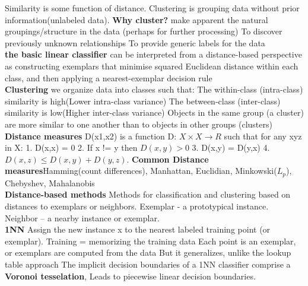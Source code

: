 \documentclass[cheatsheet.tex]{subfiles}
\begin{document}
Similarity is some function of distance. Clustering is grouping data without prior information(unlabeled data). \textbf{Why cluster?} \textbullet make apparent the natural groupings/structure in the data (perhaps for further processing)
\textbullet To discover previously unknown relationships \textbullet To provide generic labels for the data
\\
\textbf{the basic linear classifier} can be interpreted from a distance-based perspective as constructing exemplars that minimise squared Euclidean distance within each class, and then applying a nearest-exemplar decision rule
\\
\textbf{Clustering} we organize data into classes such that:
\textbullet The within-class (intra-class) similarity is high(Lower intra-class variance)
\textbullet The between-class (inter-class) similarity is low(Higher inter-class variance)
\textbullet Objects in the same group (a cluster) are more similar to one another than to objects in other groups (clusters)
\\
\textbf{Distance measures} D(x1,x2) is a function D: $X\times X\rightarrow R$ such that for any xyz in X:
1. D(x,x) = 0  2. If x != y then $D(x,y) > 0$ 3. D(x,y) = D(y,x) 4. $D(x,z)\leq D(x,y)+D(y,z)$. \textbf{Common Distance measures}Hamming(count differences), Manhattan, Euclidian, Minkowski($L_p$), Chebyshev, Mahalanobis
\\
\textbf{Distance-based methods} Methods for classification and clustering based on distances to exemplars or neighbors. Exemplar - a prototypical instance. Neighbor -- a nearby instance or exemplar. 
\\
\textbf{1NN} Assign the new instance x to the nearest labeled training point (or exemplar). 
\textbullet Training = memorizing the training data
\textbullet Each point is an exemplar, or exemplars are computed from the data
\textbullet But it generalizes, unlike the lookup table approach
\textbullet The implicit decision boundaries of a 1NN classifier comprise a \textbf{Voronoi tesselation}, Leads to piecewise linear decision boundaries.
\end{document}
